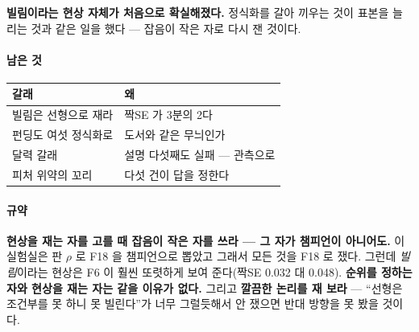 \documentclass[10pt]{article}
\begin{document}
\textbf{빌림이라는 현상 자체가 처음으로 확실해졌다.} 정식화를 갈아 끼우는
것이 표본을 늘리는 것과 같은 일을 했다 --- 잡음이 작은 자로 다시 잰 것이다.

\paragraph{남은 것}
\begin{center}\small
\begin{tabular}{ll}
\hline
갈래 & 왜 \\
\hline
빌림은 선형으로 재라 & 짝SE 가 3분의 2다 \\
펀딩도 여섯 정식화로 & 도서와 같은 무늬인가 \\
달력 갈래 & 설명 다섯째도 실패 --- 관측으로 \\
피처 위약의 꼬리 & 다섯 건이 답을 정한다 \\
\hline
\end{tabular}
\end{center}

\paragraph{규약} \textbf{현상을 재는 자를 고를 때 잡음이 작은 자를 쓰라 ---
그 자가 챔피언이 아니어도.} 이 실험실은 판 $\rho$ 로 F18 을 챔피언으로
뽑았고 그래서 모든 것을 F18 로 쟀다. 그런데 \emph{빌림}이라는 현상은 F6 이
훨씬 또렷하게 보여 준다(짝SE 0.032 대 0.048). \textbf{순위를 정하는 자와
현상을 재는 자는 같을 이유가 없다.} 그리고 \textbf{깔끔한 논리를 재 보라}
--- ``선형은 조건부를 못 하니 못 빌린다''가 너무 그럴듯해서 안 쟀으면
반대 방향을 못 봤을 것이다.
\end{document}
